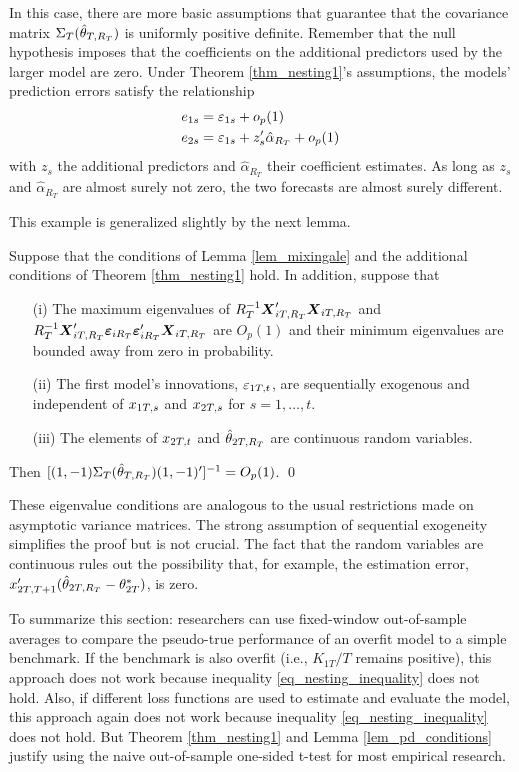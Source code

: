 \documentclass[11pt]{article} \def\baselinestretch{1.08}
\begin{document}
In this case, there are more basic assumptions that guarantee that the
covariance matrix $\Sigma_T({\hat \theta_{{}T,{R_T}}})$ is uniformly positive definite.  Remember
that the null hypothesis imposes that the coefficients on the
additional predictors used by the larger model are zero.  Under
Theorem \ref{thm_nesting1}'s assumptions, the models' prediction errors
satisfy the relationship
\begin{align*}
  e_{{1}{s}} & = \varepsilon_{{1}{s}} + o_p(1) \\
  e_{{2}{s}} & = \varepsilon_{{1}{s}} + z_{s}'\hat \alpha_{R_T} + o_p(1)
\end{align*}
with $z_s$ the additional predictors and $\hat \alpha_{R_T}$ their
coefficient estimates.  As long as $z_s$ and $\hat \alpha_{R_T}$ are
almost surely not zero, the two forecasts are almost surely
different.

This example is generalized slightly by the next lemma.  
\begin{lem} \label{lem_pd_conditions}
  Suppose that the conditions of Lemma \ref{lem_mixingale} and the
  additional conditions of Theorem \ref{thm_nesting1} hold.
  In addition, suppose that
  \begin{itemize}
  \item[(i)]  The maximum eigenvalues of
    $R_T^{-1} \boldsymbol{X}_{{i}T,{R_T}}'\boldsymbol{X}_{{i}T,{R_T}}$ and
    $R_T^{-1} \boldsymbol{X}_{{i}T,{R_T}}'\boldsymbol{\varepsilon}_{{i}{R_T}}\boldsymbol{\varepsilon}_{{i}{R_T}}'\boldsymbol{X}_{{i}T,{R_T}}$ are $O_p(1)$ and
    their minimum eigenvalues are bounded away from zero in probability.
  \item[(ii)] The first model's innovations, $\varepsilon_{{1}T,{t}}$, are
    sequentially exogenous and independent of $x_{{1}T,{s}}$ and
    $x_{{2}T,{s}}$ for $s = 1,\dotsc, t$.
  \item[(iii)] The elements of $x_{{2}T,{t}}$ and $\hat \theta_{{2}T,{R_T}}$ are
    continuous random variables.
  \end{itemize}
  Then $[(1,-1) \Sigma_T({\hat \theta_{{}T,{R_T}}}) (1,-1)']^{-1} = O_p(1)$.
  \qed
\end{lem}
These eigenvalue conditions are analogous to the usual restrictions
made on asymptotic variance matrices.  The strong assumption of
sequential exogeneity simplifies the proof but is not crucial.  The
fact that the random variables are continuous rules out the
possibility that, for example, the estimation error,
$x_{{2}T,{T+1}}'(\hat \theta_{{2}T,{R_T}} - \theta^*_{{2}T})$, is zero.

To summarize this section: researchers can use fixed-window
out-of-sample averages to compare the pseudo-true performance of an
overfit model to a simple benchmark.  If the benchmark is also overfit
(i.e., $K_{1T}/T$ remains positive), this approach does not work
because inequality \eqref{eq_nesting_inequality} does not hold.  Also,
if different loss functions are used to estimate and evaluate the
model, this approach again does not work because inequality
\eqref{eq_nesting_inequality} does not hold.  But Theorem
\ref{thm_nesting1} and Lemma \ref{lem_pd_conditions} 
justify using the naive out-of-sample one-sided t-test for most
empirical research.
\end{document}

